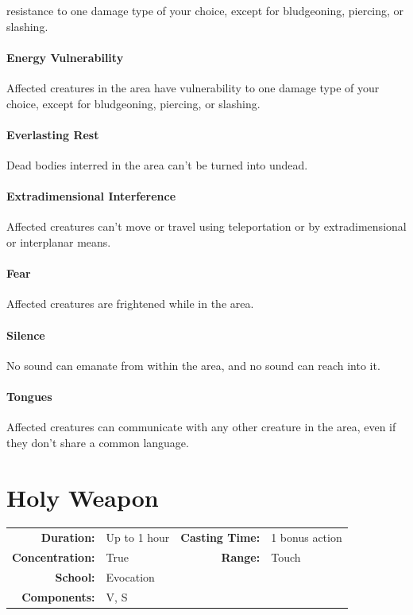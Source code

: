 \documentclass[12pt,showtrims]{memoir}
\begin{document}
resistance to one damage type of your choice, except for bludgeoning, piercing, or slashing. \paragraph{Energy Vulnerability} Affected creatures in the area have vulnerability to one damage type of your choice, except for bludgeoning, piercing, or slashing. \paragraph{Everlasting Rest} Dead bodies interred in the area can't be turned into undead. \paragraph{Extradimensional Interference} Affected creatures can't move or travel using teleportation or by extradimensional or interplanar means. \paragraph{Fear} Affected creatures are frightened while in the area. \paragraph{Silence} No sound can emanate from within the area, and no sound can reach into it. \paragraph{Tongues} Affected creatures can communicate with any other creature in the area, even if they don't share a common language.

\newpage

\newpage
\section*{Holy Weapon}

{
\small\centering\vspace{-6pt}
\begin{tabular}{rlrl}
\toprule

\textbf{Duration:} & Up to 1 hour &
\textbf{Casting Time:} & 1 bonus action \\
\textbf{Concentration:} & True &
\textbf{Range:} & Touch \\
\textbf{School:} & Evocation \\
\textbf{Components:} & \multicolumn{3}{p{0.7\textwidth}}{V, S}\\

\bottomrule
\end{tabular}
}
\end{document}
